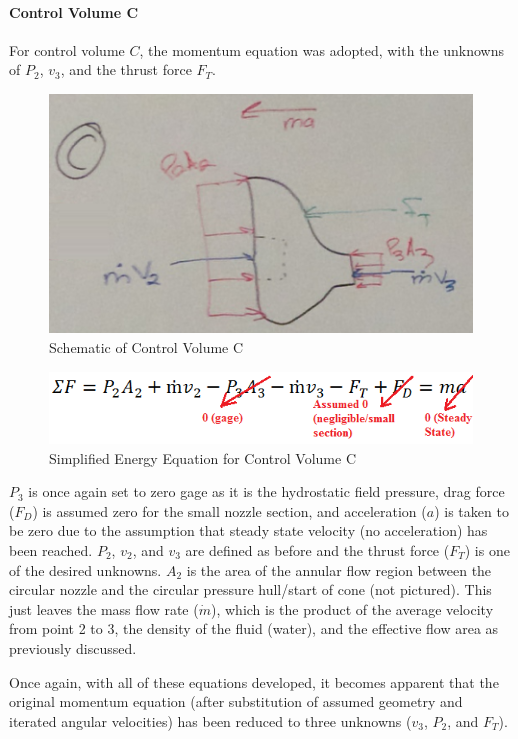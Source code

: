 \documentclass{report}
\begin{document}
\paragraph{Control Volume C}\par
For control volume $C$, the momentum equation was adopted, with the unknowns of $P_2$, $v_3$, and the thrust force $F_T$.
\begin{figure}[h]
\centering
\includegraphics{"Control Volume C"}
\caption{Schematic of Control Volume C}
\end{figure}
\begin{figure}[h]
\centering
\includegraphics{"Eqn C"}
\caption{Simplified Energy Equation for Control Volume C}
\end{figure}
$P_3$ is once again set to zero gage as it is the hydrostatic field pressure, drag force ($F_D$) is assumed zero for the small nozzle section, and acceleration ($a$) is taken to be zero due to the assumption that steady state velocity (no acceleration) has been reached.  $P_2$, $v_2$, and $v_3$ are defined as before and the thrust force ($F_T$) is one of the desired unknowns.  $A_2$ is the area of the annular flow region between the circular nozzle and the circular pressure hull/start of cone (not pictured).  This just leaves the mass flow rate ($\dot{m}$), which is the product of the average velocity from point 2 to 3, the density of the fluid (water), and the effective flow area as previously discussed.\par
Once again, with all of these equations developed, it becomes apparent that the original momentum equation (after substitution of assumed geometry and iterated angular velocities) has been reduced to three unknowns ($v_3$, $P_2$, and $F_T$).
\end{document}
